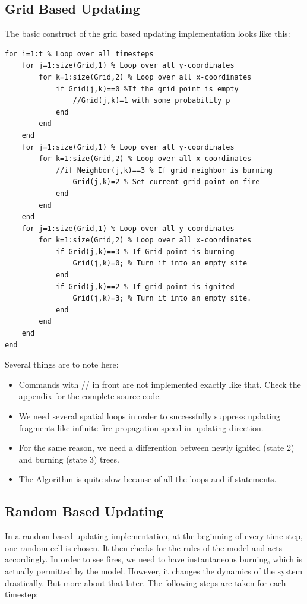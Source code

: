 \documentclass[11pt]{article}
\begin{document}
\subsection{Grid Based Updating}
The basic construct of the grid based updating implementation looks like this:
\begin{verbatim}
for i=1:t % Loop over all timesteps
    for j=1:size(Grid,1) % Loop over all y-coordinates
        for k=1:size(Grid,2) % Loop over all x-coordinates
            if Grid(j,k)==0 %If the grid point is empty
                //Grid(j,k)=1 with some probability p
            end
        end
    end
    for j=1:size(Grid,1) % Loop over all y-coordinates
        for k=1:size(Grid,2) % Loop over all x-coordinates
            //if Neighbor(j,k)==3 % If grid neighbor is burning
                Grid(j,k)=2 % Set current grid point on fire
            end
        end
    end
    for j=1:size(Grid,1) % Loop over all y-coordinates
        for k=1:size(Grid,2) % Loop over all x-coordinates
            if Grid(j,k)==3 % If Grid point is burning
                Grid(j,k)=0; % Turn it into an empty site
            end
            if Grid(j,k)==2 % If grid point is ignited
                Grid(j,k)=3; % Turn it into an empty site.
            end
        end
    end
end
\end{verbatim}
Several things are to note here:
\begin{itemize}
\item Commands with // in front are not implemented exactly like that. Check the appendix for the complete source code.
\item We need several spatial loops in order to successfully suppress updating fragments like infinite fire propagation speed in updating direction. 
\item For the same reason, we need a differention between newly ignited (state 2) and burning (state 3) trees. 
\item The Algorithm is quite slow because of all the loops and if-statements.
\end{itemize}


\subsection{Random Based Updating}
In a random based updating implementation, at the beginning of every time step, one random cell is chosen. It then checks for the rules of the model and acts accordingly. In order to see fires, we need to have instantaneous burning, which is actually permitted by the model. However, it changes the dynamics of the system drastically. But more about that later. The following steps are taken for each timestep:
\end{document}
